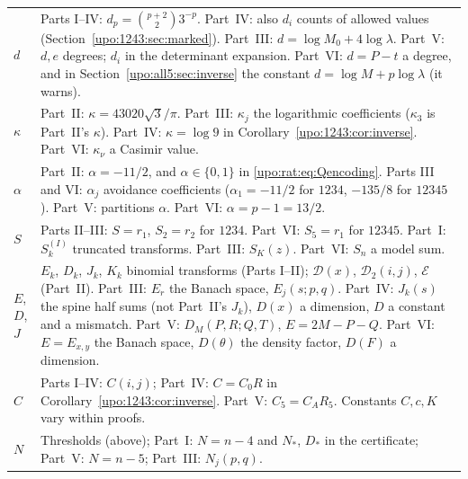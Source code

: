 \documentclass[11pt,letterpaper]{article}
\theoremstyle{remark}\newtheorem{remark}[theorem]{Remark}
\numberwithin{equation}{section}
\begin{document}
\begin{longtable}{@{}>{\raggedright\arraybackslash}p{} >{\raggedright\arraybackslash}p{}@{}}
$d$ & Parts I--IV: $d_p=\binom{p+2}23^{-p}$. Part~IV: also $d_i$ counts of allowed values (Section~\ref{upo:1243:sec:marked}). Part~III: $d=\log M_0+4\log\lambda$. Part~V: $d,e$ degrees; $d_i$ in the determinant expansion. Part~VI: $d=P-t$ a degree, and in Section~\ref{upo:all5:sec:inverse} the constant $d=\log M+p\log\lambda$ (it warns).\\
$\kappa$ & Part~II: $\kappa=43020\sqrt3/\pi$. Part~III: $\kappa_j$ the logarithmic coefficients ($\kappa_3$ is Part~II's $\kappa$). Part~IV: $\kappa=\log9$ in Corollary~\ref{upo:1243:cor:inverse}. Part~VI: $\kappa_\nu$ a Casimir value.\\
$\alpha$ & Part~II: $\alpha=-11/2$, and $\alpha\in\{0,1\}$ in \eqref{upo:rat:eq:Qencoding}. Parts III and VI: $\alpha_j$ avoidance coefficients ($\alpha_1=-11/2$ for $1234$, $-135/8$ for $12345$). Part~V: partitions $\alpha$. Part~VI: $\alpha=p-1=13/2$.\\
$S$ & Parts II--III: $S=r_1$, $S_2=r_2$ for $1234$. Part~VI: $S_5=r_1$ for $12345$. Part~I: $S_k^{(I)}$ truncated transforms. Part~III: $S_K(z)$. Part~VI: $S_n$ a model sum.\\
$E$, $D$, $J$ & $E_k$, $D_k$, $J_k$, $K_k$ binomial transforms (Parts I--II); $\mathcal D(x)$, $\mathcal D_2(i,j)$, $\mathcal E$ (Part~II). Part~III: $E_r$ the Banach space, $E_j(s;p,q)$. Part~IV: $J_k(s)$ the spine half sums (not Part~II's $J_k$), $D(x)$ a dimension, $D$ a constant and a mismatch. Part~V: $D_M(P,R;Q,T)$, $E=2M-P-Q$. Part~VI: $E=E_{x,y}$ the Banach space, $D(\theta)$ the density factor, $D(F)$ a dimension.\\
$C$ & Parts I--IV: $C(i,j)$; Part~IV: $C=C_0R$ in Corollary~\ref{upo:1243:cor:inverse}. Part~V: $C_5=C_AR_5$. Constants $C,c,K$ vary within proofs.\\
$N$ & Thresholds (above); Part~I: $N=n-4$ and $N_*$, $D_*$ in the certificate; Part~V: $N=n-5$; Part~III: $N_j(p,q)$.\\
\bottomrule
\end{longtable}
\endgroup
\end{document}
